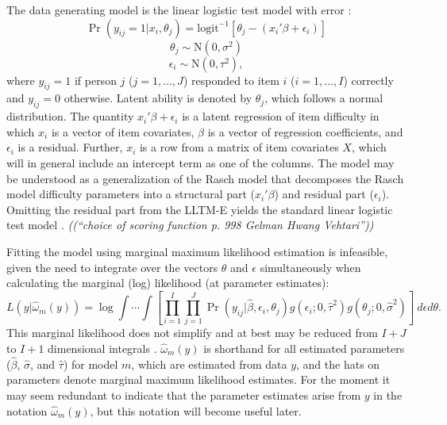 The data generating model is the linear logistic test model with error \parencite[LLTM-E;][]{DeBoeck2008}:
\begin{equation}
	\Pr(y_{ij} = 1 | x_i, \theta_j) =
	\mathrm{logit}^{-1} \left [ \theta_j - (x_i'\beta + \epsilon_i) \right ]
\end{equation}
\begin{equation}
	\theta_j \sim \mathrm{N}(0, \sigma^2)
\end{equation}
\begin{equation}
	\epsilon_i \sim \mathrm{N}(0, \tau^2)
,\end{equation}
where $y_{ij} = 1$ if person $j$ ($j = 1, \dotsc, J$) responded to item $i$ ($i = 1, \dotsc, I$) correctly and $y_{ij} = 0$ otherwise. 
Latent ability is denoted by $\theta_j$, which follows a normal distribution. 
The quantity $x_i'\beta + \epsilon_i$ is a latent regression of item difficulty in which $x_i$ is a vector of item covariates, $\beta$ is a vector of regression coefficients, and $\epsilon_i$ is a residual. 
Further, $x_i$ is a row from a matrix of item covariates $X$, which will in general include an intercept term as one of the columns.
The model may be understood as a generalization of the Rasch model \parencite{Rasch1960a} that decomposes the Rasch model difficulty parameters into a structural part ($x_i'\beta$) and residual part ($\epsilon_i$).
Omitting the residual part from the LLTM-E yields the standard linear logistic test model \parencite[LLTM;][]{Fischer1973}.
\emph{((``choice of scoring function p. 998 Gelman Hwang Vehtari''))}

Fitting the model using marginal maximum likelihood estimation is infeasible, given the need to integrate over the vectors $\theta$ and $\epsilon$ simultaneously when calculating the marginal (log) likelihood (at parameter estimates):
\begin{equation} \label{eq:lltme-likelihood}
	L(y | \hat \omega_m(y)) = \log 
		\int \cdots \int \left [
			\prod_{i=1}^I \prod_{j=1}^J
			\Pr(y_{ij} | \hat \beta, \epsilon_i, \theta_j)
			g(\epsilon_i ; 0, \hat \tau^2)
			g(\theta_j ; 0, \hat \sigma^2)
		\right ] ~d \epsilon d \theta
.\end{equation}
This marginal likelihood does not simplify and at best may be reduced from $I+J$ to $I+1$ dimensional integrals \parencite{goldstein1987multilevel, rasbash1994efficient}.
$\hat \omega_m(y)$ is shorthand for all estimated parameters ($\hat \beta$, $\hat \sigma$, and $\hat \tau$) for model $m$, which are estimated from data $y$, and the hats on parameters denote marginal maximum likelihood estimates. For the moment it may seem redundant to indicate that the parameter estimates arise from $y$ in the notation $\hat \omega_m(y)$, but this notation will become useful later.


